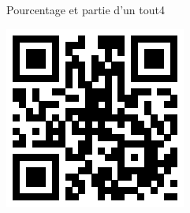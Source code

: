 \documentclass[a4paper,11pt]{report}
\begin{document}
\begin{qmoodle}{Pourcentage et partie d'un tout}{4}
{\begin{center}
		\includegraphics[scale=1]{img/no3fractions/ptpq/ptpq_8}
	\end{center}
}
\end{qmoodle}
\end{document}
